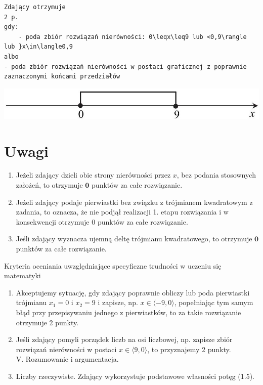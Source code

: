 \documentclass[10pt]{article}
\begin{document}
\begin{verbatim}
Zdający otrzymuje
2 p.
gdy:
    - poda zbiór rozwiązań nierówności: 0\leqx\leq9 lub <0,9\rangle lub }x\in\langle0,9
albo
- poda zbiór rozwiązań nierówności w postaci graficznej z poprawnie zaznaczonymi końcami przedziałów
\end{verbatim}

\begin{center}
\includegraphics[max width=\textwidth]{2025_02_07_e35f706dbfcfb4be75cfg-07}
\end{center}

\section*{Uwagi}
\begin{enumerate}
  \item Jeżeli zdający dzieli obie strony nierówności przez $x$, bez podania stosownych założeń, to otrzymuje $\mathbf{0}$ punktów za całe rozwiązanie.
  \item Jeżeli zdający podaje pierwiastki bez związku z trójmianem kwadratowym z zadania, to oznacza, że nie podjął realizacji 1. etapu rozwiązania i w konsekwencji otrzymuje 0 punktów za całe rozwiązanie.
  \item Jeśli zdający wyznacza ujemną deltę trójmianu kwadratowego, to otrzymuje $\mathbf{0}$ punktów za całe rozwiązanie.
\end{enumerate}

Kryteria oceniania uwzględniające specyficzne trudności w uczeniu się matematyki

\begin{enumerate}
  \item Akceptujemy sytuację, gdy zdający poprawnie obliczy lub poda pierwiastki trójmianu $x_{1}=0$ i $x_{2}=9$ i zapisze, np. $x \in\langle-9,0\rangle$, popełniając tym samym błąd przy przepisywaniu jednego z pierwiastków, to za takie rozwiązanie otrzymuje 2 punkty.
  \item Jeśli zdający pomyli porządek liczb na osi liczbowej, np. zapisze zbiór rozwiązań nierówności w postaci $x \in\langle 9,0\rangle$, to przyznajemy 2 punkty.\\
V. Rozumowanie i argumentacja.
  \item Liczby rzeczywiste. Zdający wykorzystuje podstawowe własności potęg (1.5).
\end{enumerate}
\end{document}

